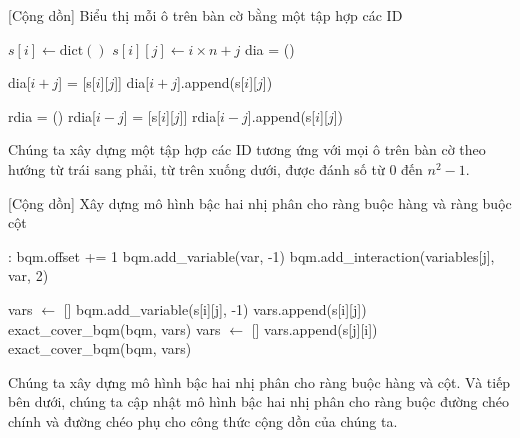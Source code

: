\begin{algorithm}[H]
    \caption{[Cộng dồn] Biểu thị mỗi ô trên bàn cờ bằng một tập hợp các ID}
    \begin{algorithmic}
        \State $s[i] \gets \text{dict}()$
            \State $s[i][j] \gets i \times n + j$
        \EndFor
    \EndFor
    \State
    \State dia = ()
    
    \State    dia[$i + j$] = [s[$i$][$j$]]
    \Else
    \State    dia[$i + j$].append(s[$i$][$j$])
    \EndIf
    \EndFor
    \EndFor
    
    
    \State
    \State rdia = ()
    \State rdia[$i - j$] = [s[$i$][$j$]]
    \Else
    \State rdia[$i - j$].append(s[$i$][$j$])
    \EndIf
    \EndFor
    \EndFor
    \end{algorithmic}
\end{algorithm}
    Chúng ta xây dựng một tập hợp các ID tương ứng với mọi ô trên bàn cờ theo hướng từ trái sang phải, từ trên xuống dưới, được đánh số từ 0 đến $n^2 -1$.


\begin{algorithm}[H]
    \caption{[Cộng dồn] Xây dựng mô hình bậc hai nhị phân cho ràng buộc hàng và ràng buộc cột}
    \begin{algorithmic}[1]
    :
    \State  bqm.offset += 1
    \State   bqm.add\_variable(var, -1)
    \State    bqm.add\_interaction(variables[j], var, 2)
       \EndFor
    \EndFor
	
    \EndFunction
    \State
    \State  vars $\gets$ []
    \State   bqm.add\_variable(s[i][j], -1)
    \State   vars.append(s[i][j])
    \EndFor
    \State  exact\_cover\_bqm(bqm, vars)
    \State  vars $\gets$ []
    \State   vars.append(s[j][i])
    \EndFor
    \State  exact\_cover\_bqm(bqm, vars)
    \EndFor
    \end{algorithmic}
\end{algorithm}
    Chúng ta xây dựng mô hình bậc hai nhị phân cho ràng buộc hàng và cột. Và tiếp bên dưới, chúng ta cập nhật mô hình bậc hai nhị phân cho ràng buộc đường chéo chính và đường chéo phụ cho công thức cộng dồn của chúng ta.

